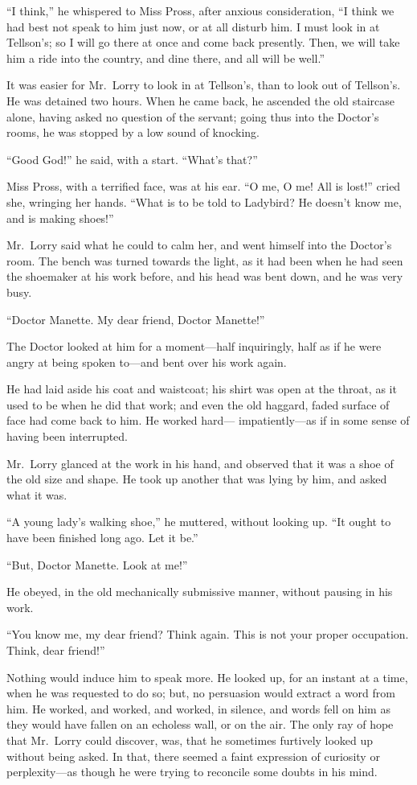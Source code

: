 ``I think,'' he whispered to Miss Pross, after anxious consideration,
``I think we had best not speak to him just now, or at all disturb him.
I must look in at Tellson's; so I will go there at once and come back
presently.  Then, we will take him a ride into the country, and dine
there, and all will be well.''

It was easier for Mr.\ Lorry to look in at Tellson's, than to look
out of Tellson's.  He was detained two hours.  When he came back,
he ascended the old staircase alone, having asked no question of
the servant; going thus into the Doctor's rooms, he was stopped by
a low sound of knocking.

``Good God!'' he said, with a start.  ``What's that?''

Miss Pross, with a terrified face, was at his ear.  ``O me, O me!
All is lost!'' cried she, wringing her hands.  ``What is to be told
to Ladybird?  He doesn't know me, and is making shoes!''

Mr.\ Lorry said what he could to calm her, and went himself into the
Doctor's room.  The bench was turned towards the light, as it had
been when he had seen the shoemaker at his work before, and his head
was bent down, and he was very busy.

``Doctor Manette.  My dear friend, Doctor Manette!''

The Doctor looked at him for a moment---half inquiringly, half as if
he were angry at being spoken to---and bent over his work again.

He had laid aside his coat and waistcoat; his shirt was open at the
throat, as it used to be when he did that work; and even the old
haggard, faded surface of face had come back to him.  He worked hard---%
impatiently---as if in some sense of having been interrupted.

Mr.\ Lorry glanced at the work in his hand, and observed that it was
a shoe of the old size and shape.  He took up another that was lying
by him, and asked what it was.

``A young lady's walking shoe,'' he muttered, without looking up.
``It ought to have been finished long ago.  Let it be.''

``But, Doctor Manette.  Look at me!''

He obeyed, in the old mechanically submissive manner, without
pausing in his work.

``You know me, my dear friend?  Think again.  This is not your proper
occupation.  Think, dear friend!''

Nothing would induce him to speak more.  He looked up, for an instant
at a time, when he was requested to do so; but, no persuasion would
extract a word from him.  He worked, and worked, and worked, in silence,
and words fell on him as they would have fallen on an echoless wall,
or on the air.  The only ray of hope that Mr.\ Lorry could discover,
was, that he sometimes furtively looked up without being asked.  In that,
there seemed a faint expression of curiosity or perplexity---as though
he were trying to reconcile some doubts in his mind.

